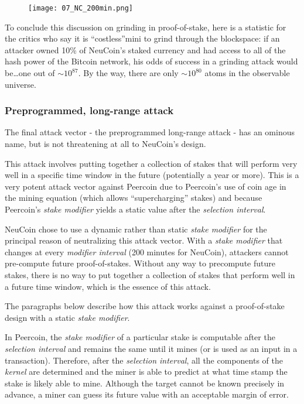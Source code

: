 \documentclass[a4paper,11pt]{article}
\begin{document}
\begin{figure}[H]
\centering
\texttt{[image: 07\_NC\_200min.png]}
\caption{}
\end{figure}











To conclude this discussion on grinding in proof-of-stake, here is a statistic for the critics who say it is ``costless''mini to grind through the blockspace: if an attacker owned 10\% of NeuCoin's staked currency and had access to all of the hash power of the Bitcoin network, his odds of success in a grinding attack would be…one out of $\sim10^{87}$. By the way, there are only $\sim10^{80}$ atoms in the observable universe.


\subsubsection{Preprogrammed, long-range attack}
\label{334}

The final attack vector - the preprogrammed long-range attack - has an ominous name, but is not threatening at all to NeuCoin's design.

This attack involves putting together a collection of stakes that will perform very well in a specific time window in the future (potentially a year or more). This is a very potent attack vector against Peercoin due to Peercoin's use of coin age in the mining equation (which allows ``supercharging'' stakes) and because Peercoin's \textit{stake modifier} yields a static value after the \textit{selection interval}. 

NeuCoin chose to use a dynamic rather than static \textit{stake modifier} for the principal reason of neutralizing this attack vector. With a \textit{stake modifier} that changes at every \textit{modifier interval} (200 minutes for NeuCoin), attackers cannot pre-compute future proof-of-stakes. Without any way to precompute future stakes, there is no way to put together a collection of stakes that perform well in a future time window, which is the essence of this attack.

The paragraphs below describe how this attack works against a proof-of-stake design with a static \textit{stake modifier}. 

In Peercoin, the \textit{stake modifier} of a particular stake is computable after the \textit{selection interval} and remains the same until it mines (or is used as an input in a transaction). Therefore, after the \textit{selection interval}, all the components of the \textit{kernel} are determined and the miner is able to predict at what time stamp the stake is likely able to mine. Although the target cannot be known precisely in advance, a miner can guess its future value with an acceptable margin of error.
\end{document}
